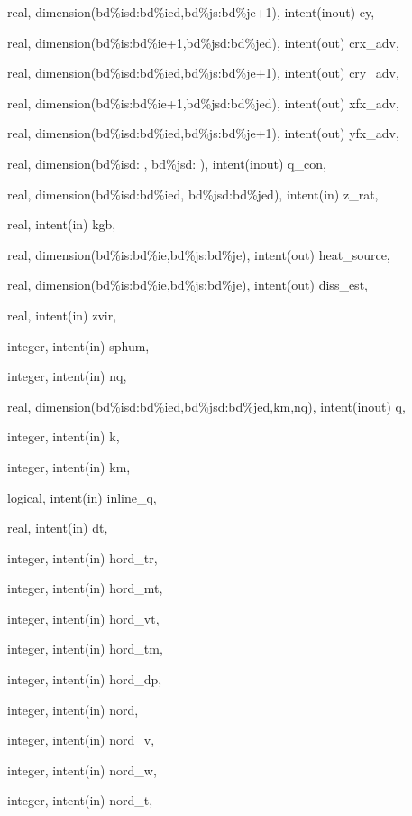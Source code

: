{\begin{DoxyParamCaption}
\item[{real, dimension(bd\%isd\-:bd\%ied,bd\%js\-:bd\%je+1), intent(inout)}]{cy, }
\item[{real, dimension(bd\%is\-:bd\%ie+1,bd\%jsd\-:bd\%jed), intent(out)}]{crx\-\_\-adv, }
\item[{real, dimension(bd\%isd\-:bd\%ied,bd\%js\-:bd\%je+1), intent(out)}]{cry\-\_\-adv, }
\item[{real, dimension(bd\%is\-:bd\%ie+1,bd\%jsd\-:bd\%jed), intent(out)}]{xfx\-\_\-adv, }
\item[{real, dimension(bd\%isd\-:bd\%ied,bd\%js\-:bd\%je+1), intent(out)}]{yfx\-\_\-adv, }
\item[{real, dimension(bd\%isd\-:      ,  bd\%jsd\-:      ), intent(inout)}]{q\-\_\-con, }
\item[{real, dimension(bd\%isd\-:bd\%ied,  bd\%jsd\-:bd\%jed), intent(in)}]{z\-\_\-rat, }
\item[{real, intent(in)}]{kgb, }
\item[{real, dimension(bd\%is\-:bd\%ie,bd\%js\-:bd\%je), intent(out)}]{heat\-\_\-source, }
\item[{real, dimension(bd\%is\-:bd\%ie,bd\%js\-:bd\%je), intent(out)}]{diss\-\_\-est, }
\item[{real, intent(in)}]{zvir, }
\item[{integer, intent(in)}]{sphum, }
\item[{integer, intent(in)}]{nq, }
\item[{real, dimension(bd\%isd\-:bd\%ied,bd\%jsd\-:bd\%jed,km,nq), intent(inout)}]{q, }
\item[{integer, intent(in)}]{k, }
\item[{integer, intent(in)}]{km, }
\item[{logical, intent(in)}]{inline\-\_\-q, }
\item[{real, intent(in)}]{dt, }
\item[{integer, intent(in)}]{hord\-\_\-tr, }
\item[{integer, intent(in)}]{hord\-\_\-mt, }
\item[{integer, intent(in)}]{hord\-\_\-vt, }
\item[{integer, intent(in)}]{hord\-\_\-tm, }
\item[{integer, intent(in)}]{hord\-\_\-dp, }
\item[{integer, intent(in)}]{nord, }
\item[{integer, intent(in)}]{nord\-\_\-v, }
\item[{integer, intent(in)}]{nord\-\_\-w, }
\item[{integer, intent(in)}]{nord\-\_\-t, }

\end{DoxyParamCaption}}
